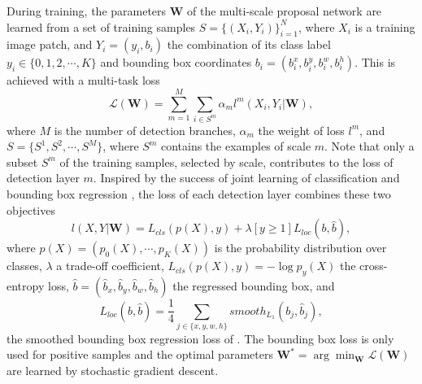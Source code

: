 \documentclass[runningheads]{llncs}
\begin{document}
During training, the parameters $\textbf{W}$ of the multi-scale proposal
network are learned from a set of training samples $S=\{(X_i,Y_i)\}_{i=1}^{N}$,
where $X_i$ is a training image patch, and $Y_i=(y_i,b_i)$ the combination of
its class label $y_i\in\{0,1,2,\cdots,K\}$ and bounding box
coordinates $b_i=(b_i^x,b_i^y,b_i^w,b_i^h)$. This is achieved with a
multi-task loss
\begin{equation}
\mathcal{L}(\textbf{W})
=\sum_{m=1}^{M}\sum_{i\in{S^m}}\alpha_{m}l^{m}(X_i,Y_i|\textbf{W}),
\label{equ:multi-task}
\end{equation}
where  $M$ is the number of detection branches,  $\alpha_m$ the weight of
loss $l^m$, and $S=\{S^1,S^2,\cdots,S^M\}$, where $S^m$ contains
the examples of scale $m$. Note that only a subset $S^m$ of the training
samples, selected by scale, contributes to the loss of detection layer $m$.
Inspired by the success of joint learning of classification and bounding box
regression
\cite{DBLP:conf/iccv/Girshick15,DBLP:conf/nips/shaoqing15fasterRcnn}, the
loss of each detection layer combines these two objectives
\begin{equation}
\label{equ:cls and bb}
l(X,Y|\textbf{W})=L_{cls}(p(X),y)+\lambda[y\geq{1}]L_{loc}(b,\hat{b}),
\end{equation}
where $p(X)=(p_0(X),\cdots,p_K(X))$ is the probability distribution over
classes, $\lambda$ a trade-off coefficient, $L_{cls}(p(X),y)=-\log p_{y}(X)$ the
cross-entropy loss, $\hat{b}=(\hat{b}_x,\hat{b}_y,\hat{b}_w,\hat{b}_h)$ the
regressed bounding box, and
\begin{equation}
L_{loc}(b,\hat{b})=\frac{1}{4}\sum_{j\in\{x,y,w,h\}}smooth_{L_{1}}(b_j,\hat{b}_j),
\end{equation}
the smoothed bounding box regression loss of \cite{DBLP:conf/iccv/Girshick15}.
The bounding box loss is only used for positive samples and the
optimal parameters $\textbf{W}^*=\arg\min_{\textbf{W}}\mathcal{L}(\textbf{W})$
are learned by stochastic gradient descent.
\end{document}

